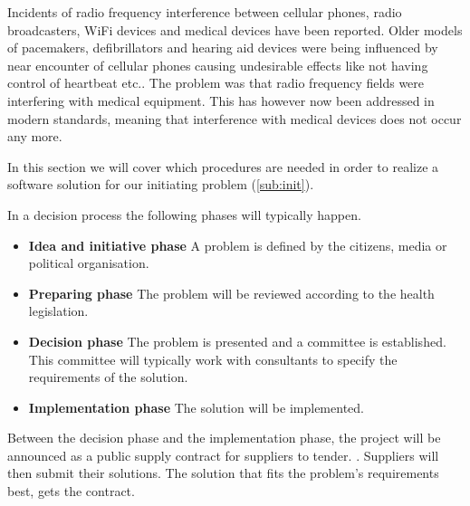 Incidents of radio frequency interference between cellular phones, radio broadcasters, WiFi devices and medical devices have been reported. Older models of pacemakers, defibrillators and hearing aid devices were being influenced by near encounter of cellular phones causing undesirable effects like not having control of heartbeat etc.. The problem was that radio frequency fields were interfering with medical equipment. This has however now been addressed in modern standards, meaning that interference with medical devices does not occur any more. \cite{Man1998,Case}


In this section we will cover which procedures are needed in order to realize a software solution for our initiating problem (\cref{sub:init}).

In a decision process the following phases will typically happen. \cite{Sjaelland}

\begin{itemize}
  \setlength{\itemsep}{1pt}
  \setlength{\parskip}{0pt}
  \setlength{\parsep}{0pt}
	\item \textbf{Idea and initiative phase} A problem is defined by the citizens, media or political organisation.
	\item \textbf{Preparing phase} The problem will be reviewed according to the health legislation.
	\item \textbf{Decision phase} The problem is presented and a committee is established. This committee will typically work with consultants to specify the requirements of the solution.
	\item \textbf{Implementation phase} The solution will be implemented. 
\end{itemize}


Between the decision phase and the implementation phase, the project will be announced as a public supply contract for suppliers to tender. \cite{Union2004}. Suppliers will then submit their solutions. The solution that fits the problem's requirements best, gets the contract. 

